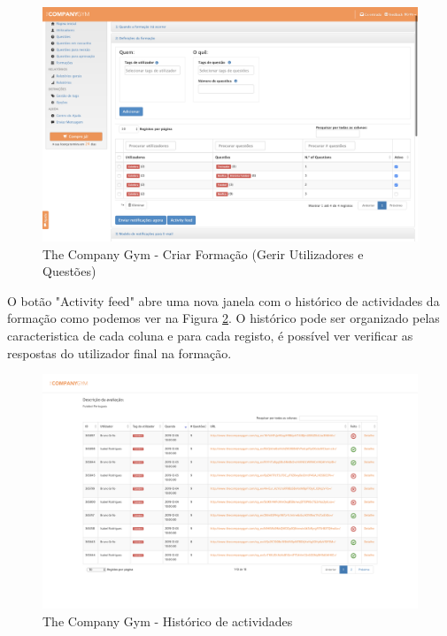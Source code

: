 \begin{figure}[ht!]
	\begin{center}
		\includegraphics[width=1\textwidth]{img/tcg/tcg-form2.png}
		\caption{The Company Gym - Criar Formação (Gerir Utilizadores e Questões)}
		\label{fig:tcg-form2}
	\end{center}
\end{figure}

O botão "Activity feed" abre uma nova janela com o histórico de actividades da formação como podemos ver na Figura \ref{fig:tcg-feed}. O histórico pode ser organizado pelas caracteristica de cada coluna e para cada registo, é possível ver verificar as respostas do utilizador final na formação.


\begin{figure}[ht!]
	\begin{center}
		\includegraphics[width=1\textwidth]{img/tcg/tcg-feed.png}
		\caption{The Company Gym - Histórico de actividades}
		\label{fig:tcg-feed}
	\end{center}
\end{figure}

